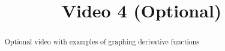 \documentclass[handout]{ximera}
\title{Video 4 (Optional)}
\begin{document}
\begin{abstract}
Optional video with examples of graphing derivative functions
\end{abstract}

\maketitle

\end{document}
